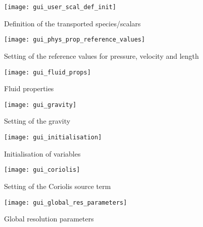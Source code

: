 {{\begin{figure}[!ht]
\begin{center}
\texttt{[image: gui\_user\_scal\_def\_init]}
\caption{Definition of the transported species/scalars}
\label{fig:gui_species}
\end{center}
\end{figure}

\begin{figure}[!ht]
\begin{center}
\texttt{[image: gui\_phys\_prop\_reference\_values]}
\caption{Setting of the reference values for pressure, velocity and length}
\label{fig:gui_reference_values}
\end{center}
\end{figure}

\begin{figure}[!ht]
\begin{center}
\texttt{[image: gui\_fluid\_props]}
\caption{Fluid properties}
\label{fig:gui_fluid_props}
\end{center}
\end{figure}

\begin{figure}[!ht]
\begin{center}
\texttt{[image: gui\_gravity]}
\caption{Setting of the gravity}
\label{fig:gui_gravity}
\end{center}
\end{figure}

\begin{figure}[!ht]
\begin{center}
\texttt{[image: gui\_initialisation]}
\caption{Initialisation of variables}
\label{fig:gui_initialisation}
\end{center}
\end{figure}


\begin{figure}[!ht]
\begin{center}
\texttt{[image: gui\_coriolis]}
\caption{Setting of the Coriolis source term}
\label{fig:gui_coriolis}
\end{center}
\end{figure}

\begin{figure}[!ht]
\begin{center}
\texttt{[image: gui\_global\_res\_parameters]}
\caption{Global resolution parameters}
\label{fig:gui_global_parameters}
\end{center}
\end{figure}

}}
